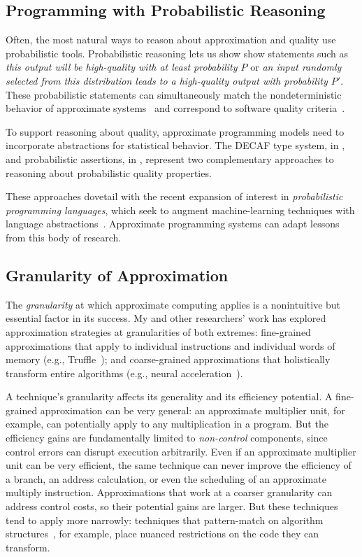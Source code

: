\subsection{Programming with Probabilistic Reasoning}

Often, the most natural ways to reason about approximation and quality use
probabilistic tools.
Probabilistic reasoning lets us show show statements such as \emph{this output
will be high-quality with at least probability $P$} or \emph{an input randomly
selected from this distribution leads to a high-quality output with
probability $P'$}.
These probabilistic statements can simultaneously match the nondeterministic behavior
of approximate systems~\cite{truffle, npu, approxstorage}
and correspond to software quality criteria~\cite{decaf, passert}.

To support reasoning about quality, approximate
programming models need to incorporate abstractions for statistical behavior.
The DECAF type system, in , and
probabilistic assertions, in , represent two
complementary approaches to reasoning about probabilistic quality
properties.

These approaches dovetail with the recent expansion of interest in
\emph{probabilistic programming languages}, which seek to augment
machine-learning techniques with language abstractions~\cite{church}.
Approximate programming systems can adapt lessons from this body of research.

\subsection{Granularity of Approximation}
\label{sec:princ:granularity}

The \emph{granularity} at which approximate computing applies is a
nonintuitive but essential factor in its success.
My and other researchers' work has explored approximation strategies at
granularities of both extremes:
fine-grained approximations that apply to individual instructions and
individual words of memory (e.g., Truffle~\cite{truffle});
and coarse-grained approximations that holistically transform entire
algorithms (e.g., neural acceleration~\cite{npu}).

A technique's granularity affects its
generality and its efficiency potential.
A fine-grained approximation can be very general:
an approximate multiplier unit, for example, can potentially apply to any
multiplication in a program.
But the efficiency gains are fundamentally limited to \emph{non-control} components,
since control errors can disrupt execution arbitrarily.
Even if an approximate multiplier unit can be very efficient,
the same technique can never
improve the efficiency of a branch, an address calculation,
or even the
scheduling of an approximate multiply instruction.
Approximations that work at a coarser granularity can address control costs,
so their potential gains are larger.
But these techniques tend to apply more narrowly:
techniques that pattern-match on algorithm structures~\cite{paraprox},
for example, place nuanced restrictions on the code they can transform.

